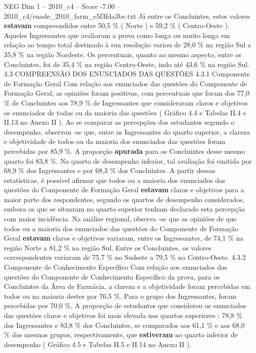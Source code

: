 \begin{textsample}{NEG Dim 1 – 2010\_c4 – Score -7.00 – 2010\_c4/enade\_2010\_farm\_c5f3fda3be.txt}
Já entre os Concluintes, estes valores \textbf{estavam} compreendidos entre 50,5 \% ( Norte ) e 59,2 \% ( Centro-Oeste ).
Aqueles Ingressantes que avaliaram a prova como longa ou muito longa em relação ao tempo total destinado à sua resolução variou de 28,0 \% na região Sul a 35,8 \% na região Nordeste.
Os percentuais, quanto ao mesmo aspecto, entre os Concluintes, foi de 35,4 \% na região Centro-Oeste, indo até 43,6 \% na região Sul. 4.3 COMPREENSÃO DOS ENUNCIADOS DAS QUESTÕES 4.3.1 Componente de Formação Geral Com relação aos enunciados das questões do Componente de Formação Geral, as opiniões foram positivas, com percentuais que foram dos 77,0 \% de Concluintes aos 78,9 \% de Ingressantes que consideraram claros e objetivos os enunciados de todas ou da maioria das questões ( Gráfico 4.4 e Tabelas II.4 e II.13 no Anexo II ).
Ao se comparar as percepções dos estudantes segundo o desempenho, observou -se que, entre os Ingressantes do quarto superior, a clareza e objetividade de todos ou da maioria dos enunciados das questões foram percebidas por 85,9 \%.
A proporção \textbf{apurada} para os Concluintes desse mesmo quarto foi 83,8 \%.
No quarto de desempenho inferior, tal avaliação foi emitida por 68,9 \% dos Ingressantes e por 68,3 \% dos Concluintes.
A partir dessas estatísticas, é possível afirmar que todos ou a maioria dos enunciados das questões do Componente de Formação Geral \textbf{estavam} claros e objetivos para a maior parte dos respondentes, segundo os quartos de desempenho considerados, embora os que se situaram no quarto superior tenham declarado esta percepção com maior incidência.
Na análise regional, observa -se que as opiniões de que todos ou a maioria dos enunciados das questões do Componente de Formação Geral \textbf{estavam} claros e objetivos variaram, entre os Ingressantes, de 74,1 \% na região Norte a 81,2 \% na região Sul.
Entre os Concluintes, os valores correspondentes variaram de 75,7 \% no Sudeste a 79,5 \% no Centro-Oeste. 4.3.2 Componente de Conhecimento Específico Com relação aos enunciados das questões do Componente de Conhecimento Específico da prova, para os Concluintes da Área de Farmácia, a clareza e a objetividade foram percebidas em todos ou na maioria destes por 76,5 \%.
Para o grupo dos Ingressantes, foram percebidas por 70,0 \%.
A proporção de estudantes que considerou os enunciados das questões claros e objetivos foi mais elevada nos quartos superiores : 78,8 \% dos Ingressantes e 83,8 \% dos Concluintes, se comparados aos 61,1 \% e aos 68,0 \% dos mesmos grupos, respectivamente, que \textbf{estiveram} no quarto inferior de desempenho ( Gráfico 4.5 e Tabelas II.5 e II.14 no Anexo II ).

\end{textsample}
